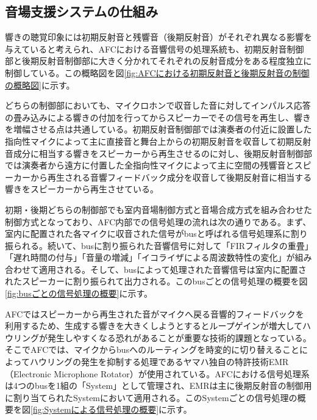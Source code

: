 \documentclass[11pt,a4j]{jreport}
\begin{document}
\subsection{音場支援システムの仕組み}
響きの聴覚印象には初期反射音と残響音（後期反射音）がそれぞれ異なる影響を与えていると考えられ、AFCにおける音響信号の処理系統も、初期反射音制御部と後期反射音制御部に大きく分かれてそれぞれの反射音成分をある程度独立に制御している。この概略図を図\ref{fig:AFCにおける初期反射音と後期反射音の制御の概略図}に示す。

どちらの制御部においても、マイクロホンで収音した音に対してインパルス応答の畳み込みによる響きの付加を行ってからスピーカーでその信号を再生し、響きを増幅させる点は共通している。初期反射音制御部では演奏者の付近に設置した指向性マイクによって主に直接音と舞台上からの初期反射音を収音して初期反射音成分に相当する響きをスピーカーから再生させるのに対し、後期反射音制御部では演奏者から遠方に付置した全指向性マイクによって主に空間の残響音とスピーカーから再生される音響フィードバック成分を収音して後期反射音に相当する響きをスピーカーから再生させている。

初期・後期どちらの制御部でも室内音場制御方式と音場合成方式を組み合わせた制御方式となっており、AFC内部での信号処理の流れは次の通りである。まず、室内に配置された各マイクに収音された信号がbusと呼ばれる信号処理系に割り振られる。続いて、busに割り振られた音響信号に対して「FIRフィルタの重畳」「遅れ時間の付与」「音量の増減」「イコライザによる周波数特性の変化」が組み合わせて適用される。そして、busによって処理された音響信号は室内に配置されたスピーカーに割り振られて出力される。このbusごとの信号処理の概要を図\ref{fig:busごとの信号処理の概要}に示す。

AFCではスピーカーから再生された音がマイクへ戻る音響的フィードバックを利用するため、生成する響きを大きくしようとするとループゲインが増大してハウリングが発生しやすくなる恐れがあることが重要な技術的課題となっている。そこでAFCでは、マイクからbusへのルーティングを時変的に切り替えることによってハウリングの発生を抑制する処理であるヤマハ独自の特許技術EMR（Electronic Microphone Rotator）\cite{清水1996EMR}が使用されている。AFCにおける信号処理系は4つのbusを1組の「System」として管理され、EMRは主に後期反射音の制御用に割り当てられたSystemにおいて適用される。このSystemごとの信号処理の概要を図\ref{fig:Systemによる信号処理の概要}に示す。

\end{document}
